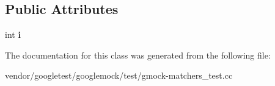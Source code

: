 \subsection*{Public Attributes}
\begin{DoxyCompactItemize}
\item 
\mbox{\label{classtesting_1_1gmock__matchers__test_1_1_derived_a357d6747c44d7af7159fb5898a782f1b}} 
int {\bfseries i}
\end{DoxyCompactItemize}


The documentation for this class was generated from the following file\+:\begin{DoxyCompactItemize}
\item 
vendor/googletest/googlemock/test/gmock-\/matchers\+\_\+test.\+cc\end{DoxyCompactItemize}
